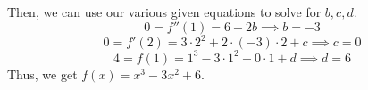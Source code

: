 \documentclass[11pt]{exam}
\begin{document}
\begin{questions}
\begin{solution}
\[      \]
      Then, we can use our various given equations to solve for
      \(b,c,d\).
      \[
        0 = f''(1) = 6+2b \implies b = -3
      \]
      \[
        0 = f'(2) = 3 \cdot 2^2 + 2 \cdot (-3) \cdot 2 + c \implies c=0
      \]
      \[
        4 = f(1) = 1^3-3 \cdot 1^2 - 0 \cdot 1 + d \implies d = 6
      \]
      Thus, we get \(f(x) = x^3-3x^2+6\).
    \end{solution}
    \pagebreak
    \ifprintanswers 
    
    \else
    
    \fi
    \pagebreak
    \pagebreak
    \ifprintanswers 
    
    \else
    
    \fi
    \pagebreak
    \pagebreak
    \ifprintanswers 
    
    \else
    
    \fi
    \pagebreak
    \pagebreak
    \ifprintanswers 
    
    \else
    
    \fi
    \pagebreak
    \pagebreak
    \ifprintanswers 
    
    \else
    
    \fi
    \pagebreak
    \pagebreak
    \ifprintanswers 
    
    \else
    
    \fi
\end{questions}
\end{document}
